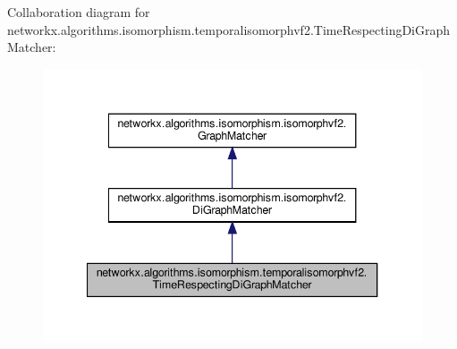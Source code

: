 Collaboration diagram for networkx.\+algorithms.\+isomorphism.\+temporalisomorphvf2.\+Time\+Respecting\+Di\+Graph\+Matcher\+:
\nopagebreak
\begin{figure}[H]
\begin{center}
\leavevmode
\includegraphics[width=340pt]{classnetworkx_1_1algorithms_1_1isomorphism_1_1temporalisomorphvf2_1_1TimeRespectingDiGraphMatcher__coll__graph}
\end{center}
\end{figure}
